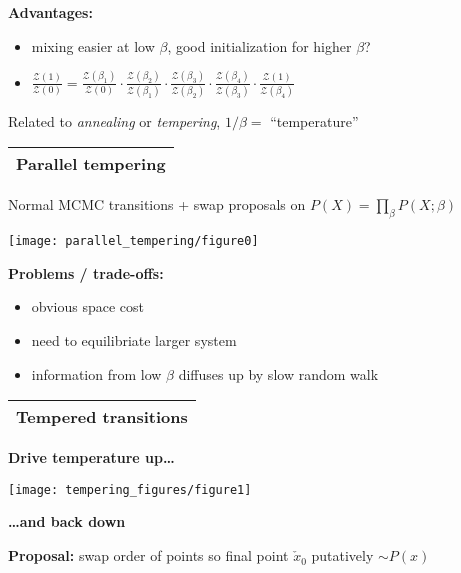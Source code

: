 \documentclass[25pt,landscape]{foils}
\newcommand{\Gray}{\textcolor{mygray}}
\newcommand{\Green}{\textcolor{mypine}}
\newcommand{\myfoilhead}[1]{
\newpage
\vspace*{-1cm}
\Gray{
\begin{tabular*}{\textwidth}{l}
{\bf \Huge #1} \\
\bottomrule
\end{tabular*}}}
\newcommand{\Z}{\mathcal{Z}}
\begin{document}
\vfill

\Green{\bf Advantages:}
\begin{itemize}
    \item mixing easier at low $\beta$, good initialization for higher $\beta$?
    \item $\displaystyle \frac{\Z(1)}{\Z(0)} =
        \frac{\Z(\beta_1)}{\Z(0)}\cdot
        \frac{\Z(\beta_2)}{\Z(\beta_1)}\cdot
        \frac{\Z(\beta_3)}{\Z(\beta_2)}\cdot
        \frac{\Z(\beta_4)}{\Z(\beta_3)}\cdot
        \frac{\Z(1)}{\Z(\beta_4)}$
\end{itemize}

\vfill

Related to \emph{annealing} or \emph{tempering}, $1/\beta = $ ``temperature''

\myfoilhead{Parallel tempering}

\vspace*{1.5cm}

Normal MCMC transitions + swap proposals on
$\displaystyle P(X) = \prod_\beta P(X;\beta)$

\vfill

\centerline{\texttt{[image: parallel\_tempering/figure0]}}

\vfill

\Green{\bf Problems / trade-offs:}
\begin{itemize}
    \setlength{\itemsep}{5pt}
    \setlength{\parskip}{5pt}
    \setlength{\parsep}{0cm}
    \item obvious space cost
    \item need to equilibriate larger system
    \item information from low $\beta$ diffuses up by slow random walk
\end{itemize}

\myfoilhead{Tempered transitions}

\vspace*{2cm}

\Green{\bf Drive temperature up\dots}

\centerline{\texttt{[image: tempering\_figures/figure1]}}

\vspace*{-1cm}

\hfill\Green{\bf \dots and back down}

\vfill

\Green{\bf Proposal:} swap order of points so final point $\check{x}_0$ putatively $\sim P(x)$\\[-0.2in]
\end{document}
